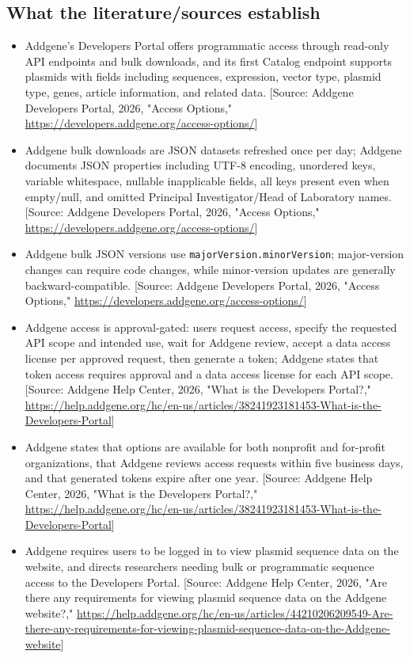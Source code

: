\documentclass[11pt]{report}
\begin{document}
\subsection{What the literature/sources establish}
\begin{itemize}
\item Addgene's Developers Portal offers programmatic access through read-only API endpoints and bulk downloads, and its first Catalog endpoint supports plasmids with fields including sequences, expression, vector type, plasmid type, genes, article information, and related data. [Source: Addgene Developers Portal, 2026, "Access Options," \url{https://developers.addgene.org/access-options/}]
\item Addgene bulk downloads are JSON datasets refreshed once per day; Addgene documents JSON properties including UTF-8 encoding, unordered keys, variable whitespace, nullable inapplicable fields, all keys present even when empty/null, and omitted Principal Investigator/Head of Laboratory names. [Source: Addgene Developers Portal, 2026, "Access Options," \url{https://developers.addgene.org/access-options/}]
\item Addgene bulk JSON versions use \texttt{majorVersion.minorVersion}; major-version changes can require code changes, while minor-version updates are generally backward-compatible. [Source: Addgene Developers Portal, 2026, "Access Options," \url{https://developers.addgene.org/access-options/}]
\item Addgene access is approval-gated: users request access, specify the requested API scope and intended use, wait for Addgene review, accept a data access license per approved request, then generate a token; Addgene states that token access requires approval and a data access license for each API scope. [Source: Addgene Help Center, 2026, "What is the Developers Portal?," \url{https://help.addgene.org/hc/en-us/articles/38241923181453-What-is-the-Developers-Portal}]
\item Addgene states that options are available for both nonprofit and for-profit organizations, that Addgene reviews access requests within five business days, and that generated tokens expire after one year. [Source: Addgene Help Center, 2026, "What is the Developers Portal?," \url{https://help.addgene.org/hc/en-us/articles/38241923181453-What-is-the-Developers-Portal}]
\item Addgene requires users to be logged in to view plasmid sequence data on the website, and directs researchers needing bulk or programmatic sequence access to the Developers Portal. [Source: Addgene Help Center, 2026, "Are there any requirements for viewing plasmid sequence data on the Addgene website?," \url{https://help.addgene.org/hc/en-us/articles/44210206209549-Are-there-any-requirements-for-viewing-plasmid-sequence-data-on-the-Addgene-website}]

\end{itemize}
\end{document}
